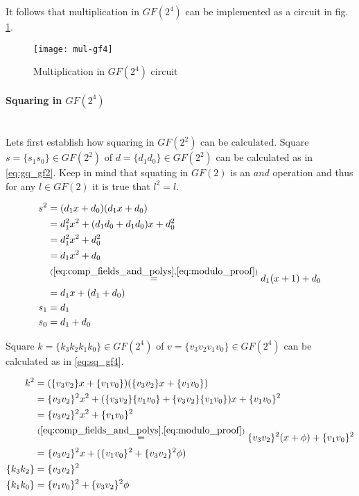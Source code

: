 It follows that multiplication in $GF(2^4)$ can be implemented as a circuit in fig. \ref{fig:mul_gf4}.

\begin{figure}[!h]
\label{fig:mul_gf4}
\centering
\texttt{[image: mul-gf4]}
\caption{Multiplication in $GF(2^4)$ circuit}
\end{figure}


\paragraph{Squaring in $GF(2^4)$}\mbox{}\\
Lets first establish how squaring in $GF(2^2)$ can be calculated. 
Square $s = \{s_1s_0\} \in GF(2^2)$ of $d = \{d_1d_0\} \in GF(2^2)$ can be calculated as in \ref{eq:gq_gf2}. Keep in mind that squating in $GF(2)$ is an $and$ operation and thus for any $l \in GF(2)$ it is true that $l^2 = l$.

\begin{equation}
\label{eq:sq_gf2}
\begin{aligned}
s^2 &= (d_1x + d_0)(d_1x + d_0) \\
&= d_1^2x^2 + (d_1d_0 + d_1d_0)x + d_0^2 \\
&= d_1^2x^2 + d_0^2 \\
&= d_1x^2 + d_0\\
&\stackrel{(\ref{eq:comp_fields_and_polys}, \ref{eq:modulo_proof})}{=}
d_1(x + 1) + d_0 \\
&= d_1x + (d_1 + d_0)\\
s_1 &= d_1\\
s_0 &= d_1 + d_0
\end{aligned}
\end{equation}

Square $k = \{k_3k_2k_1k_0\} \in GF(2^4)$ of $v = \{v_3v_2v_1v_0\} \in GF(2^4)$ can be calculated as in \ref{eq:sq_gf4}.

\begin{equation}
\label{eq:sq_gf4}
\begin{aligned}
k^2 &= (\{v_3v_2\}x + \{v_1v_0\})(\{v_3v_2\}x + \{v_1v_0\})\\
&= \{v_3v_2\}^2x^2 + (\{v_3v_2\}\{v_1v_0\} + \{v_3v_2\}\{v_1v_0\})x + \{v_1v_0\}^2 \\
&= \{v_3v_2\}^2x^2 + \{v_1v_0\}^2 \\
&\stackrel{(\ref{eq:comp_fields_and_polys}, \ref{eq:modulo_proof})}{=}
\{v_3v_2\}^2(x + \phi) + \{v_1v_0\}^2 \\
&= \{v_3v_2\}^2x + (\{v_1v_0\}^2 + \{v_3v_2\}^2\phi)\\
\{k_3k_2\} &= \{v_3v_2\}^2 \\
\{k_1k_0\} &= \{v_1v_0\}^2 + \{v_3v_2\}^2\phi
\end{aligned}
\end{equation}

